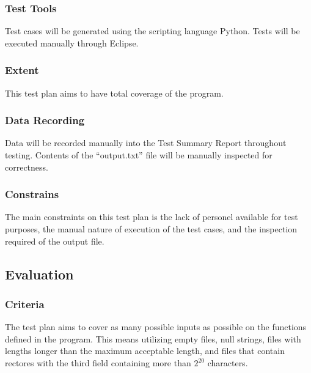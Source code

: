 \documentclass[]{article}
\begin{document}
	\subsubsection{Test Tools}
	Test cases will be generated using the scripting language Python.
	Tests will be executed manually through Eclipse.
	
	\subsubsection{Extent}
	This test plan aims to have total coverage of the program.
	
	\subsubsection{Data Recording}
	Data will be recorded manually into the Test Summary Report throughout testing.
	Contents of the ``output.txt'' file will be manually inspected for correctness.
	
	\subsubsection{Constrains}
	The main constraints on this test plan is the lack of personel available for
	test purposes, the manual nature of execution of the test cases, and the
	inspection required of the output file.

\subsection{Evaluation}
	\subsubsection{Criteria}
	The test plan aims to cover as many possible inputs as possible on the
	functions defined in the program.  This means utilizing empty files, null
	strings, files with lengths longer than the maximum acceptable length, and
	files that contain rectores with the third field containing more than $2^{20}$
	characters.
	

\end{document}
